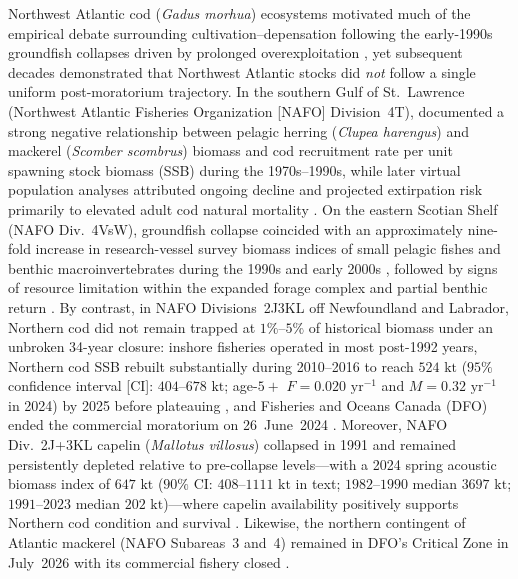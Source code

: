 \documentclass[11pt,letterpaper]{article}
\begin{document}
Northwest Atlantic cod (\emph{Gadus morhua}) ecosystems motivated much of the empirical debate surrounding cultivation--depensation following the early-1990s groundfish collapses driven by prolonged overexploitation \citep{hutchings1994what,myers1997why,shelton2006fishing,lilly2013review}, yet subsequent decades demonstrated that Northwest Atlantic stocks did \emph{not} follow a single uniform post-moratorium trajectory. In the southern Gulf of St.~Lawrence (Northwest Atlantic Fisheries Organization [NAFO] Division~4T), \citet{swain2000pelagic} documented a strong negative relationship between pelagic herring (\emph{Clupea harengus}) and mackerel (\emph{Scomber scombrus}) biomass and cod recruitment rate per unit spawning stock biomass (SSB) during the 1970s--1990s, while later virtual population analyses attributed ongoing decline and projected extirpation risk primarily to elevated adult cod natural mortality \citep{swain2008predicted}. On the eastern Scotian Shelf (NAFO Div.~4VsW), groundfish collapse coincided with an approximately nine-fold increase in research-vessel survey biomass indices of small pelagic fishes and benthic macroinvertebrates during the 1990s and early 2000s \citep{frank2005trophic,bundy2005can}, followed by signs of resource limitation within the expanded forage complex and partial benthic return \citep{frank2011transient}. By contrast, in NAFO Divisions~2J3KL off Newfoundland and Labrador, Northern cod did not remain trapped at $1\%$--$5\%$ of historical biomass under an unbroken 34-year closure: inshore fisheries operated in most post-1992 years, Northern cod SSB rebuilt substantially during 2010--2016 to reach $524\text{ kt}$ ($95\%$ confidence interval [CI]: $404$--$678\text{ kt}$; age-$5+$ $F = 0.020\text{ yr}^{-1}$ and $M = 0.32\text{ yr}^{-1}$ in 2024) by 2025 before plateauing \citep{dfo2025cod}, and Fisheries and Oceans Canada (DFO) ended the commercial moratorium on 26~June~2024 \citep{dfo2024reopen,dfo2025cod}. Moreover, NAFO Div.~2J+3KL capelin (\emph{Mallotus villosus}) collapsed in 1991 and remained persistently depleted relative to pre-collapse levels---with a 2024 spring acoustic biomass index of $647\text{ kt}$ ($90\%$ CI: $408$--$1111\text{ kt}$ in text; $1982$--$1990$ median $3697\text{ kt}$; $1991$--$2023$ median $202\text{ kt}$)---where capelin availability positively supports Northern cod condition and survival \citep{rose2002capelin,dfo2025capelin,dfo2025cod}. Likewise, the northern contingent of Atlantic mackerel (NAFO Subareas~3 and~4) remained in DFO's Critical Zone in July~2026 with its commercial fishery closed \citep{dfo2026mackerel}.
\end{document}
